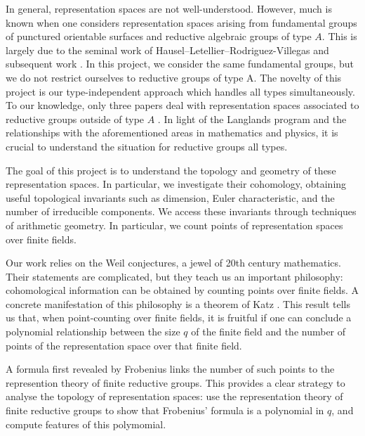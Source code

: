 \documentclass{amsart}
\theoremstyle{plain}
\theoremstyle{definition}
\theoremstyle{remark}
\begin{document}
In general, representation spaces are not well-understood. However, much is known when one considers representation spaces arising from fundamental groups of punctured orientable surfaces and reductive algebraic groups of type $A$. This is largely due to the seminal work of Hausel--Letellier--Rodriguez-Villegas \cite{HRV08, HLRV11} and subsequent work \cite{Letellier15, Mellit18, Ballandras23, LRV23}. In this project, we consider the same fundamental groups, but we do not restrict ourselves to reductive groups of type A. The novelty of this project is our type-independent approach which handles all types simultaneously. To our knowledge, only three papers deal with representation spaces associated to reductive groups outside of type $A$ \cite{Cambo17, BK22, KNP23}. In light of the Langlands program and the relationships with the aforementioned areas in mathematics and physics, it is crucial to understand the situation for reductive groups all types.

The goal of this project is to understand the topology and geometry of these representation spaces. In particular, we investigate their cohomology, obtaining useful topological invariants such as dimension, Euler characteristic, and the number of irreducible components. We access these invariants through techniques of arithmetic geometry. In particular, we count points of representation spaces over finite fields.

Our work relies on the Weil conjectures, a jewel of 20th century mathematics. Their statements are complicated, but they teach us an important philosophy: cohomological information can be obtained by counting points over finite fields. A concrete manifestation of this philosophy is a theorem of Katz \cite[Theorem 6.1.2]{HRV08}. This result tells us that, when point-counting over finite fields, it is fruitful if one can conclude a polynomial relationship between the size $q$ of the finite field and the number of points of the representation space over that finite field.

A formula first revealed by Frobenius links the number of such points to the represention theory of finite reductive groups. This provides a clear strategy to analyse the topology of representation spaces: use the representation theory of finite reductive groups to show that Frobenius' formula is a polynomial in $q$, and compute features of this polymomial. 
\end{document}
